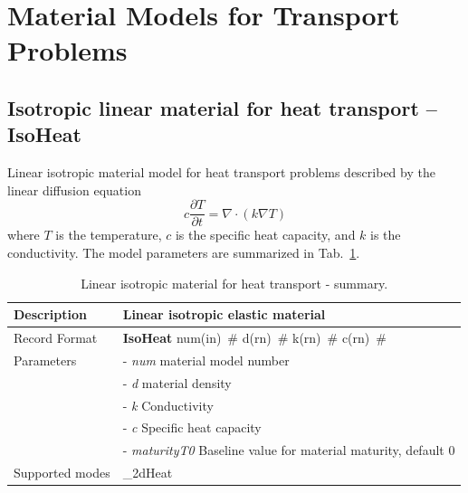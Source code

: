 \documentclass[a4paper]{article}
\newcommand{\descitem}[1]{{\noindent \bf #1}}
\newcommand{\elemparam}[2]{{{#1\tiny (#2)}~\#}}
\newcommand{\param}[1]{{\it #1}}
\newenvironment{mmt}{\begin{tabular}{|l|p{9cm}|}}{\end{tabular}\\}
\newenvironment{mmt}{\begin{tabular}{|l|l|}}{\end{tabular}\\}
\begin{document}
\clearpage

\section{Material Models for Transport Problems}
\subsection{Isotropic linear material for heat transport -- IsoHeat}
\label{IsoLET}
Linear isotropic material model for heat transport problems described
by the linear diffusion equation
\begin{equation}\label{lindiffheat}
c\frac{\partial T}{\partial t} = \nabla \cdot \left( k \nabla T \right)
\end{equation}
where $T$ is the temperature, $c$ is the specific heat capacity,
and $k$ is the conductivity.
The model parameters are summarized
in Tab.~\ref{Isoheat_table}.

\begin{table}[!htb]
\begin{mmt}
\hline
Description & Linear isotropic elastic material\\
\hline
Record Format & \descitem{IsoHeat} \elemparam{num}{in}
\elemparam{d}{rn} \elemparam{k}{rn} \elemparam{c}{rn}\\
Parameters &- \param{num} material model number\\
&- \param{d} material density\\
&- \param{k} Conductivity\\
&- \param{c} Specific heat capacity\\
&- \param{maturityT0} Baseline value for material maturity, default 0\\
Supported modes& \_2dHeat\\
\hline
\end{mmt}
\caption{Linear isotropic material for heat transport - summary.}
\label{Isoheat_table}
\end{table}
\end{document}
